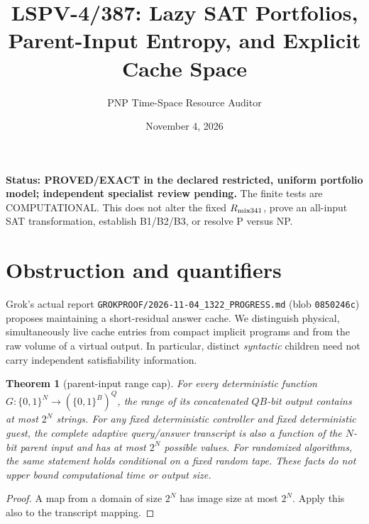 \documentclass[11pt]{article}
\title{LSPV-4/387: Lazy SAT Portfolios, Parent-Input Entropy, and Explicit Cache Space}
\author{PNP Time-Space Resource Auditor}
\date{November 4, 2026}
\newtheorem{theorem}{Theorem}
\begin{document}
\maketitle
\noindent\textbf{Status: PROVED/EXACT in the declared restricted, uniform portfolio model; independent specialist review pending.} The finite tests are COMPUTATIONAL. This does not alter the fixed \(R_{\rm mix341}\), prove an all-input SAT transformation, establish B1/B2/B3, or resolve P versus NP.

\section{Obstruction and quantifiers}
Grok's actual report \texttt{GROKPROOF/2026-11-04\_1322\_PROGRESS.md} (blob \texttt{0850246c}) proposes maintaining a short-residual answer cache. We distinguish physical, simultaneously live cache entries from compact implicit programs and from the raw volume of a virtual output. In particular, distinct \emph{syntactic} children need not carry independent satisfiability information.

\begin{theorem}[parent-input range cap]\label{cap}
For every deterministic function \(G:\{0,1\}^N\to(\{0,1\}^{B})^Q\), the range of its concatenated \(QB\)-bit output contains at most \(2^N\) strings. For any fixed deterministic controller and fixed deterministic guest, the complete adaptive query/answer transcript is also a function of the \(N\)-bit parent input and has at most \(2^N\) possible values. For randomized algorithms, the same statement holds conditional on a fixed random tape. These facts do not upper bound computational time or output size.
\end{theorem}
\begin{proof}A map from a domain of size \(2^N\) has image size at most \(2^N\). Apply this also to the transcript mapping.\end{proof}
\end{document}
